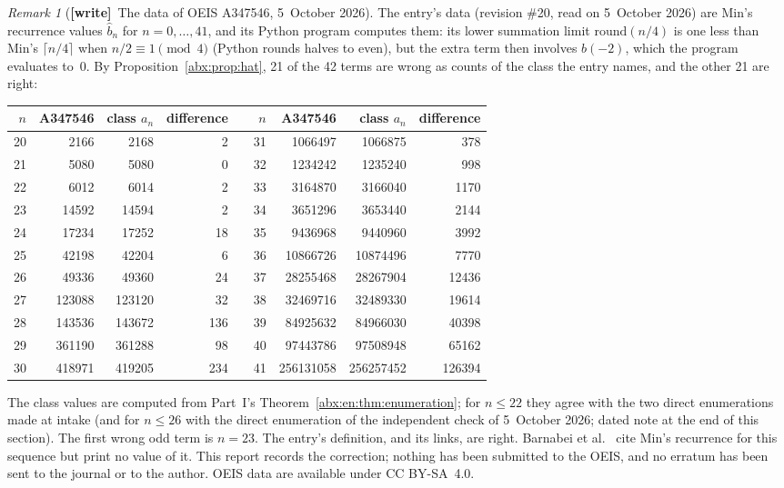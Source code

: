\documentclass[11pt,letterpaper]{article}
\numberwithin{equation}{section}
\theoremstyle{remark}\newtheorem{remark}[theorem]{Remark}
\newcommand{\wtag}{\textup{\textbf{[write]}}}
\begin{document}
\begin{remark}[\wtag\ The data of OEIS A347546, 5~October 2026]\label{abx:rem:oeis}
The entry's data (revision \#20, read on 5~October 2026) are Min's recurrence values $\hat b_n$ for $n=0,\ldots,41$, and its Python program computes them: its lower summation limit $\mathrm{round}(n/4)$ is one less than Min's $\lceil n/4\rceil$ when $n/2\equiv1\pmod4$ (Python rounds halves to even), but the extra term then involves $b(-2)$, which the program evaluates to~$0$. By Proposition~\ref{abx:prop:hat}, 21 of the 42 terms are wrong as counts of the class the entry names, and the other 21 are right:
\begin{center}
\small
\begin{tabular}{@{}r r r r c r r r r@{}}
\toprule
$n$ & A347546 & class $a_n$ & difference && $n$ & A347546 & class $a_n$ & difference\\
\midrule
20 & 2166 & 2168 & 2 && 31 & 1066497 & 1066875 & 378\\
21 & 5080 & 5080 & 0 && 32 & 1234242 & 1235240 & 998\\
22 & 6012 & 6014 & 2 && 33 & 3164870 & 3166040 & 1170\\
23 & 14592 & 14594 & 2 && 34 & 3651296 & 3653440 & 2144\\
24 & 17234 & 17252 & 18 && 35 & 9436968 & 9440960 & 3992\\
25 & 42198 & 42204 & 6 && 36 & 10866726 & 10874496 & 7770\\
26 & 49336 & 49360 & 24 && 37 & 28255468 & 28267904 & 12436\\
27 & 123088 & 123120 & 32 && 38 & 32469716 & 32489330 & 19614\\
28 & 143536 & 143672 & 136 && 39 & 84925632 & 84966030 & 40398\\
29 & 361190 & 361288 & 98 && 40 & 97443786 & 97508948 & 65162\\
30 & 418971 & 419205 & 234 && 41 & 256131058 & 256257452 & 126394\\
\bottomrule
\end{tabular}
\end{center}
The class values are computed from Part~I's Theorem~\ref{abx:en:thm:enumeration}; for $n\le22$ they agree with the two direct enumerations made at intake \textup{(and for $n\le26$ with the direct enumeration of the independent check of 5~October 2026; dated note at the end of this section)}. The first wrong odd term is $n=23$. The entry's definition, and its links, are right. Barnabei et al.\ \cite{barnabei} cite Min's recurrence for this sequence but print no value of it. This report records the correction; nothing has been submitted to the OEIS, and no erratum has been sent to the journal or to the author. OEIS data are available under CC BY-SA~4.0.
\end{remark}
\end{document}
